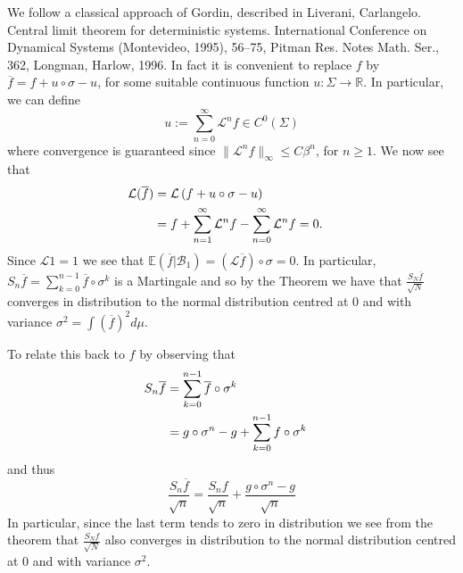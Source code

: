 \documentclass[11pt]{scrartcl}
\theoremstyle{plain} %
\theoremstyle{definition}
\begin{document}
We follow a classical approach of Gordin, described in 
Liverani, Carlangelo.
Central limit theorem for deterministic systems. International Conference on Dynamical Systems (Montevideo, 1995), 56--75,
Pitman Res. Notes Math. Ser., 362, Longman, Harlow, 1996.
In fact it is convenient to replace $f$ by $\overline f = f + u\circ \sigma - u$, for some suitable continuous function $u: \Sigma \to \mathbb R$.    In particular, 
we can define 
$$u := \sum_{n=0}^\infty \mathcal L^n f \in C^0(\Sigma)$$ where convergence
is guaranteed since $\|\mathcal L^n f\|_\infty   \leq C \beta^n$, for $n \geq 1$.  
We now see that 
$$
\begin{aligned}
\mathcal L (\overline f) &= 
\mathcal L \left(
 f + u\circ \sigma - u
\right)\cr
&= f +  \sum_{n=1}^\infty \mathcal L^n f 
-  \sum_{n=0}^\infty \mathcal L^n f = 0.
\cr
\end{aligned}
$$
Since $\mathcal L 1 = 1$ we see that 
$\mathbb E (\overline f  | \mathcal  B_1) = (\mathcal L \overline f) \circ \sigma = 0$.
In particular,  $S_n\overline f = \sum_{k=0}^{n-1} \overline f \circ \sigma^k$ is a Martingale  and so by the Theorem we have that 
$\frac{S_N\overline f}{\sqrt{N}}$ converges in distribution to the normal distribution centred at $0$ and with variance $\sigma^2 = \int  (\overline f)^2 d\mu$.

To relate this back to $f$ by observing that
$$
\begin{aligned}
S_n\overline f &= \sum_{k=0}^{n-1} \overline f \circ \sigma^k \cr 
&  =   g\circ \sigma^n   - g  +  \sum_{k=0}^{n-1} f \circ \sigma^k 
\end{aligned}
$$
and thus 
$$
\frac{S_n\overline f}{\sqrt{n}}
= \frac{S_n f}{\sqrt{n}} + \frac{g\circ \sigma^n   - g}{\sqrt{n}}
$$
In particular, since the last term tends to zero in distribution we see from the theorem that 
$\frac{S_N  f}{\sqrt{N}}$ also converges in distribution to the normal distribution centred at $0$ and with variance $\sigma^2$.  
\end{document}
